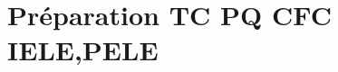 \documentclass[a4paper,12pt,answers,addpoints]{exam}
\begin{document}
	\unframedsolutions
	\pointsinmargin
	\bracketedpoints
	
\section*{Préparation TC PQ CFC IELE,PELE}
\begin{questions}


\end{questions}
\end{document}
